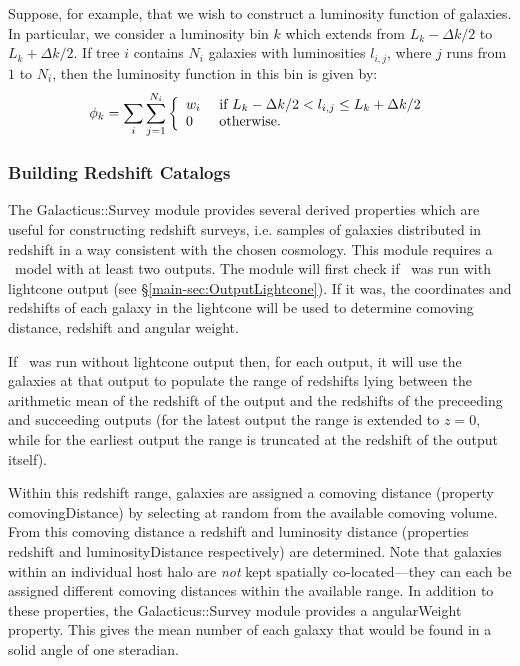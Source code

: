 Suppose, for example, that we wish to construct a luminosity function of galaxies. In particular, we consider a luminosity bin $k$ which extends from $L_k-\Delta k/2$ to $L_k+\Delta k/2$. If tree $i$ contains $N_i$ galaxies with luminosities $l_{i,j}$, where $j$ runs from $1$ to $N_i$, then the luminosity function in this bin is given by:
\begin{equation}
 \phi_k = \sum_i \sum_{j=1}^{N_i} \left\{ \begin{array}{ll} w_i & \hbox{ if  } L_k-\Delta k/2 < l_{i,j} \le L_k+\Delta k/2 \\ 0 & \hbox{ otherwise.} \end{array} \right.
\end{equation}

\subsubsection{Building Redshift Catalogs}\label{sec:Galacticus::Survey}

The {\normalfont \ttfamily Galacticus::Survey} module provides several derived properties which are useful for constructing redshift surveys, i.e. samples of galaxies distributed in redshift in a way consistent with the chosen cosmology. This module requires a \glc\ model with at least two outputs. The module will first check if \glc\ was run with lightcone output (see \S\ref{main-sec:OutputLightcone}). If it was, the coordinates and redshifts of each galaxy in the lightcone will be used to determine comoving distance, redshift and angular weight.

If \glc\ was run without lightcone output then, for each output, it will use the galaxies at that output to populate the range of redshifts lying between the arithmetic mean of the redshift of the output and the redshifts of the preceeding and succeeding outputs (for the latest output the range is extended to $z=0$, while for the earliest output the range is truncated at the redshift of the output itself).

Within this redshift range, galaxies are assigned a comoving distance (property {\normalfont \ttfamily comovingDistance}) by selecting at random from the available comoving volume. From this comoving distance a redshift and luminosity distance (properties {\normalfont \ttfamily redshift} and {\normalfont \ttfamily luminosityDistance} respectively) are determined. Note that galaxies within an individual host halo are \emph{not} kept spatially co-located---they can each be assigned different comoving distances within the available range. In addition to these properties, the {\normalfont \ttfamily Galacticus::Survey} module provides a {\normalfont \ttfamily angularWeight} property. This gives the mean number of each galaxy that would be found in a solid angle of one steradian.

